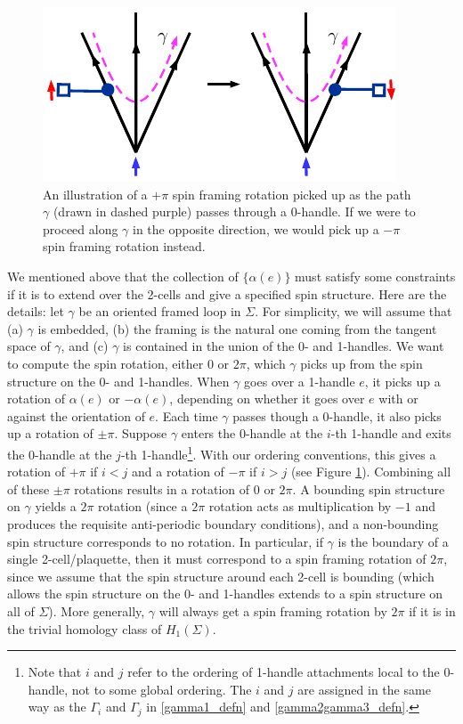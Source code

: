 \begin{figure}
\begin{center}
\includegraphics{spin_rot_through_0handle.pdf}
\caption{ \label{spin_rot_through_0handle} An illustration of a $+\pi$ spin framing rotation picked up as the path $\gamma$ (drawn in dashed purple) passes through a 0-handle. 
If we were to proceed along $\gamma$ in the opposite direction, we would pick up a $-\pi$ spin framing rotation instead.   }
\end{center}
\end{figure}

We mentioned above that the collection of $\{\alpha(e)\}$ must satisfy some constraints if it is 
to extend over the 2-cells and give a specified spin structure.
Here are the details:
let $\gamma$ be an oriented framed loop in $\Sigma$.
For simplicity, we will assume that (a) $\gamma$ is embedded, (b) the framing is the natural one coming from the tangent 
space of $\gamma$, and (c) $\gamma$ is contained in the union of the 0- and 1-handles.
We want to compute the spin rotation, either 0 or $2\pi$, which $\gamma$ picks up from the spin structure on the 0- and 1-handles.
When $\gamma$ goes over a 1-handle $e$, it picks up a rotation of $\alpha(e)$ or $-\alpha(e)$, depending on whether it goes over $e$
with or against the orientation of $e$.
Each time $\gamma$ passes though a 0-handle, it also picks up a rotation of $\pm\pi$.
Suppose $\gamma$ enters the 0-handle at the $i$-th 1-handle and exits the 0-handle at the $j$-th 1-handle\footnote{Note that $i$ and $j$ refer to the ordering of 1-handle attachments local to the 0-handle, not to some global ordering. The $i$ and $j$ are assigned in the same way as the $\Gamma_i$ and $\Gamma_j$ in \eqref{gamma1_defn} and \eqref{gamma2gamma3_defn}.}.
With our ordering conventions, this gives a rotation of $+\pi$ if $i<j$ and a rotation of $-\pi$ if $i > j$ (see Figure \ref{spin_rot_through_0handle}).
Combining all of these $\pm\pi$ rotations results in a rotation of 0 or $2\pi$.
A bounding spin structure on $\gamma$ yields a $2\pi$ rotation (since a $2\pi$ rotation acts as 
multiplication by $-1$ and produces the requisite anti-periodic boundary conditions), and a non-bounding 
spin structure corresponds to no rotation.
In particular, if $\gamma$ is the boundary of a single 2-cell/plaquette, then it must correspond to a spin 
framing rotation of $2\pi$, since we assume that the spin structure around each 2-cell is bounding (which 
allows the spin structure on the 0- and 1-handles extends to a spin structure on all of $\Sigma$). 
More generally, $\gamma$ will always get a spin framing rotation by $2\pi$ if it is in the trivial homology 
class of $H_1(\Sigma)$.



